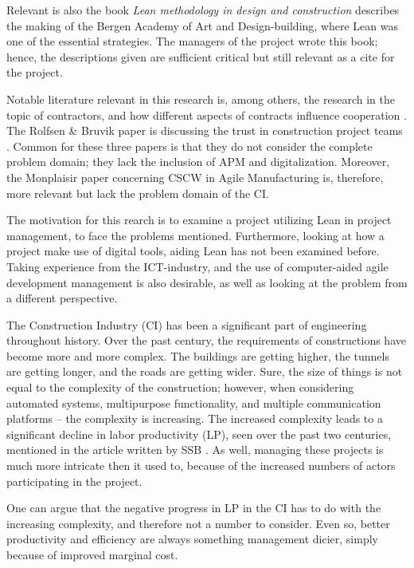 Relevant is also the book \textit{Lean methodology in design and construction} \cite{lean_i_praksis} describes the making of the Bergen Academy of Art and Design-building, where Lean was one of the essential strategies. The managers of the project wrote this book; hence, the descriptions given are sufficient critical but still relevant as a cite for the project. 

Notable literature relevant in this research is, among others, the research in the topic of contractors, and how different aspects of contracts influence cooperation \cite{miller2002harmonization, zaghloul2003construction}. The Rolfsen \& Bruvik paper is discussing the trust in construction project teams \cite{rolfsen}. Common for these three papers is that they do not consider the complete problem domain; they lack the inclusion of APM and digitalization. Moreover, the Monplaisir paper concerning CSCW in Agile Manufacturing \cite{monplaisir2002enhancing} is, therefore, more relevant but lack the problem domain of the CI. 

The motivation for this rearch is to examine a project utilizing Lean in project management, to face the problems mentioned. Furthermore, looking at how a project make use of digital tools, aiding Lean has not been examined before. Taking experience from the ICT-industry, and the use of computer-aided agile development management is also desirable, as well as looking at the problem from a different perspective.

The Construction Industry (CI) has been a significant part of engineering throughout history. Over the past century, the requirements of constructions have become more and more complex. The buildings are getting higher, the tunnels are getting longer, and the roads are getting wider. Sure, the size of things is not equal to the complexity of the construction; however, when considering automated systems, multipurpose functionality, and multiple communication platforms – the complexity is increasing. The increased complexity leads to a significant decline in labor productivity (LP), seen over the past two centuries, mentioned in the article written by SSB \cite{productivity}. As well, managing these projects is much more intricate then it used to, because of the increased numbers of actors participating in the project. 

One can argue that the negative progress in LP in the CI has to do with the increasing complexity, and therefore not a number to consider. Even so, better productivity and efficiency are always something management dicier, simply because of improved marginal cost.

